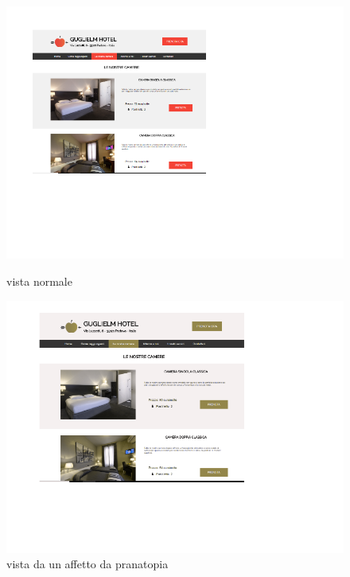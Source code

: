 \begin{figure}[htbp]
	\centering
	\begin{minipage}[c]{.40\textwidth}
		\includegraphics[width=.70\textwidth]{../templates/_Immagini/normal.png}
		\caption{vista normale}
	\end{minipage}%
	\hspace{10mm}%
	\begin{minipage}[c]{.40\textwidth}
		\includegraphics[width=.70\textwidth]{../templates/_Immagini/pranatopia.png}
		\caption{vista da un affetto da pranatopia}
	\end{minipage}
\end{figure}

